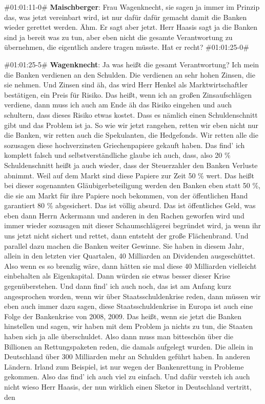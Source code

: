 \begin{description}
	\begin{linenumbers}[1]
		\item \#01:01:11-0\# \textbf{Maischberger}: Frau Wagenknecht, sie sagen ja immer im Prinzip das, was jetzt vereinbart wird, ist nur dafür dafür gemacht damit die Banken wieder gerettet werden. Ähm. Er sagt aber jetzt. Herr Haasis sagt ja die Banken sind ja bereit was zu tun, aber eben nicht die gesamte Verantwortung zu übernehmen, die eigentlich andere tragen müsste. Hat er recht? \#01:01:25-0\#
		
		\item \#01:01:25-5\# \textbf{Wagenknecht}: Ja was heißt die gesamt Verantwortung? Ich mein die Banken verdienen an den Schulden. Die verdienen an sehr hohen Zinsen, die sie nehmen. Und Zinsen sind äh, das wird Herr Henkel als Marktwirtschaftler bestätigen, ein Preis für Risiko. Das heißt, wenn ich an großen Zinsaufschlägen verdiene, dann muss ich auch am Ende äh das Risiko eingehen und auch schultern, dass dieses Risiko etwas kostet. Dass es nämlich einen Schuldenschnitt gibt und das Problem ist ja. So wie wir jetzt rangehen, retten wir eben nicht nur die Banken, wir retten auch die Spekulanten, die Hedgefonds. Wir retten alle die sozusagen diese hochverzinsten Griechenpapiere gekauft haben. Das find' ich komplett falsch und selbstverständliche glaube ich auch, dass, also 20 \% Schuldenschnitt heißt ja auch wieder, dass der Steuerzahler den Banken Verluste abnimmt. Weil auf dem Markt sind diese Papiere zur Zeit 50 \% wert. Das heißt bei dieser sogenannten Gläubigerbeteiligung werden den Banken eben statt 50 \%, die sie am Markt für ihre Papiere noch bekommen, von der öffentlichen Hand garantiert 80 \% abgesichert. Das ist völlig absurd. Das ist öffentliches Geld, was eben dann Herrn Ackermann und anderen in den Rachen geworfen wird und immer wieder sozusagen mit dieser Schaumschlägerei begründet wird, ja wenn ihr uns jetzt nicht sichert und rettet, dann entsteht der große Flächenbrand. Und parallel dazu machen die Banken weiter Gewinne. Sie haben in diesem Jahr, allein in den letzten vier Quartalen, 40 Milliarden an Dividenden ausgeschüttet. Also wenn es so brenzlig wäre, dann hätten sie mal diese 40 Milliarden vielleicht einbehalten als Eigenkapital. Dann würden sie etwas besser dieser Krise gegenüberstehen. Und dann find' ich auch noch, das ist am Anfang kurz angesprochen worden, wenn wir über Staatsschuldenkrise reden, dann müssen wir eben auch immer dazu sagen, diese Staatsschuldenkrise in Europa ist auch eine Folge der Bankenkrise von 2008, 2009. Das heißt, wenn sie jetzt die Banken hinstellen und sagen, wir haben mit dem Problem ja nichts zu tun, die Staaten haben sich ja alle überschuldet. Also dann muss man bitteschön über die Billionen an Rettungspaketen reden, die damals aufgelegt wurden. Die allein in Deutschland über 300 Milliarden mehr an Schulden geführt haben. In anderen Ländern. Irland zum Beispiel, ist nur wegen der Bankenrettung in Probleme gekommen. Also das find' ich auch viel zu einfach. Und dafür versteh ich auch nicht wieso Herr Haasis, der nun wirklich einen Sketor in Deutschland vertritt, den 
\end{linenumbers}
\end{description}
